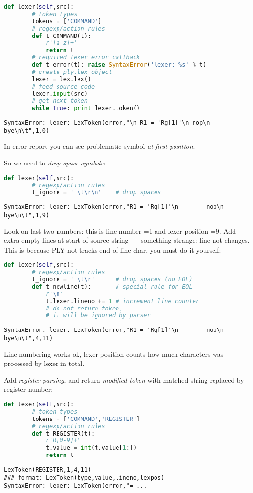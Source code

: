 \begin{lstlisting}[language=python]
	def lexer(self,src):
		# token types
		tokens = ['COMMAND']		
		# regexp/action rules
		def t_COMMAND(t):
			r'[a-z]+'
			return t
		# required lexer error callback
		def t_error(t): raise SyntaxError('lexer: %s' % t)
		# create ply.lex object
		lexer = lex.lex()				
		# feed source code
		lexer.input(src)				
		# get next token						 
		while True: print lexer.token()	
\end{lstlisting}
\begin{lstlisting}
SyntaxError: lexer: LexToken(error,"\n R1 = 'Rg[1]'\n nop\n bye\n\t",1,0)
\end{lstlisting}

In error report you can see problematic symbol \emph{at first position}.

So we need to \emph{drop space symbols}:
\begin{lstlisting}[language=python]
	def lexer(self,src):
		# regexp/action rules
		t_ignore = ' \t\r\n'	# drop spaces
\end{lstlisting}
\begin{lstlisting}
SyntaxError: lexer: LexToken(error,"R1 = 'Rg[1]'\n        nop\n       
bye\n\t",1,9)
\end{lstlisting}
Look on last two numbers: this is line number =1 and lexer position =9. Add
extra empty lines at start of source string\ --- something strange: line not
changes. This is because PLY not tracks end of line char, you must do it
yourself:
\begin{lstlisting}[language=python]
	def lexer(self,src):
		# regexp/action rules
		t_ignore = ' \t\r'		# drop spaces (no EOL)
		def t_newline(t):		# special rule for EOL
			r'\n'
			t.lexer.lineno += 1	# increment line counter
			# do not return token,
			# it will be ignored by parser
\end{lstlisting}
\begin{lstlisting}
SyntaxError: lexer: LexToken(error,"R1 = 'Rg[1]'\n        nop\n       
bye\n\t",4,11)
\end{lstlisting}
Line numbering works ok, lexer position counts how much characters was processed
by lexer in total.

Add \emph{register parsing}, and return \textit{modified token} with matched
string replaced by register number:
\begin{lstlisting}[language=python]
	def lexer(self,src):
		# token types
		tokens = ['COMMAND','REGISTER']
		# regexp/action rules
		def t_REGISTER(t):
			r'R[0-9]+'
			t.value = int(t.value[1:])
			return t
\end{lstlisting}
\begin{lstlisting}
LexToken(REGISTER,1,4,11)
### format: LexToken(type,value,lineno,lexpos)
SyntaxError: lexer: LexToken(error,"= ...
\end{lstlisting}

